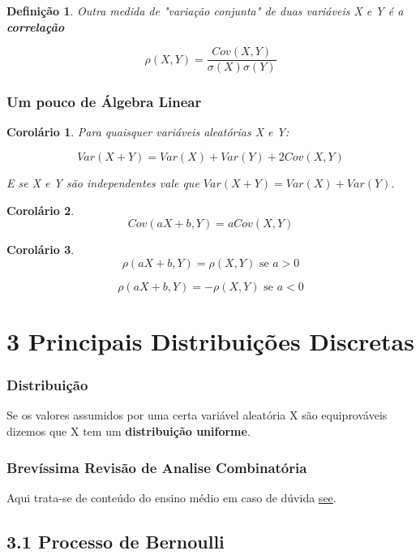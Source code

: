 \documentclass[12pt]{article}
\newtheorem{corollary}{Corolário}[theorem]
\newtheorem{definition}{Definição}
\begin{document}
\begin{definition}
    Outra medida de "variação conjunta" de duas variáveis X e Y é a \textbf{correlação}
    
    $$\rho (X, Y) = \dfrac{Cov (X, Y)}{\sigma (X) \sigma(Y)}$$
\end{definition}

\subsubsection*{Um pouco de Álgebra Linear}
\begin{corollary}
    Para quaisquer variáveis aleatórias X e Y:
    
    $$Var(X + Y) = Var(X) + Var(Y) + 2 Cov (X, Y)$$
    
    E se X e Y são independentes vale que $Var(X + Y) = Var(X) + Var(Y)$.
\end{corollary}

\begin{corollary}
    $$Cov (aX + b, Y) = a Cov (X, Y)$$
\end{corollary}

\begin{corollary}
    $$\rho (a X + b, Y) = \rho (X, Y) \text{ se } a > 0$$
    
    $$\rho (a X + b, Y) = - \rho (X, Y) \text{ se } a < 0$$
\end{corollary}

\section*{3 Principais Distribuições Discretas}
\label{s10}

\subsubsection*{Distribuição}
Se os valores assumidos por uma certa variável aleatória X são equiprováveis dizemos que X tem um \textbf{distribuição uniforme}.

\subsubsection*{Brevíssima Revisão de Analise Combinatória}
Aqui trata-se de conteúdo do ensino médio em caso de dúvida \href{https://pt.wikipedia.org/wiki/Combinat\%C3\%B3ria}{see}.

\subsection*{3.1 Processo de Bernoulli}
\label{s11}
\end{document}
